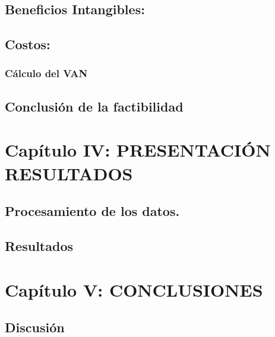 \documentclass[11pt]{article}
\begin{document}
\hypertarget{beneficios-intangibles}{%
\subsection{Beneficios Intangibles:}\label{beneficios-intangibles}}

\hypertarget{costos}{%
\subsection{Costos:}\label{costos}}

\hypertarget{cuxe1lculo-del-van}{%
\subsubsection{Cálculo del VAN}\label{cuxe1lculo-del-van}}

\hypertarget{conclusiuxf3n-de-la-factibilidad}{%
\subsection{Conclusión de la
factibilidad}\label{conclusiuxf3n-de-la-factibilidad}}

\hypertarget{capuxedtulo-iv-presentaciuxf3n-resultados}{%
\section{Capítulo IV: PRESENTACIÓN
RESULTADOS}\label{capuxedtulo-iv-presentaciuxf3n-resultados}}

\hypertarget{procesamiento-de-los-datos.}{%
\subsection{Procesamiento de los
datos.}\label{procesamiento-de-los-datos.}}

\hypertarget{resultados}{%
\subsection{Resultados}\label{resultados}}

\hypertarget{capuxedtulo-v-conclusiones}{%
\section{Capítulo V: CONCLUSIONES}\label{capuxedtulo-v-conclusiones}}

\hypertarget{discusiuxf3n}{%
\subsection{Discusión}\label{discusiuxf3n}}
\end{document}
